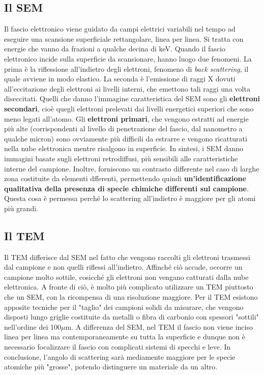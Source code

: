 \documentclass{book}
\begin{document}
                \subsection*{Il SEM}
                        Il fascio elettronico viene guidato da campi elettrici variabili nel tempo 
                        ad eseguire una scansione superficiale rettangolare, linea per linea. Si tratta
                        con energie che vanno da frazioni a qualche decina di keV. Quando il fascio elettronico
                        incide sulla superficie da scansionare, hanno luogo due fenomeni. La prima è la riflessione 
                        all'indietro degli elettroni, fenomeno di \textit{back scattering}, il quale avviene in modo elastico.
                        La seconda è l'emissione di raggi X dovuti all'eccitazione degli elettroni ai livelli interni, che emettono 
                        tali raggi una volta diseccitati. Quelli che danno l'immagine caratteristica del SEM sono gli \textbf{elettroni secondari},
                        cioè quegli elettroni prelevati dai livelli energetici superiori che sono meno legati all'atomo. Gli \textbf{elettroni primari},
                        che vengono estratti ad energie più alte (corrispondenti al livello di penetrazione del fascio, dal nanometro a qualche micron) sono 
                        ovviamente più difficili da estrarre e vengono ricatturati nella nube elettronica mentre risalgono in superficie.
                        In sintesi, i SEM danno immagini basate sugli elettroni retrodiffusi, più sensibili alle caratteristiche interne del campione. Inoltre,
                        forniscono un contrasto differente nel caso di larghe zona costituite da elementi dfferenti, permettendo quindi
                        \textbf{un'identificazione qualitativa della presenza di specie chimiche differenti sul campione}. Questa cosa è permessa perché
                        lo scattering all'indietro è maggiore per gli atomi più grandi.
                \subsection*{Il TEM}
                        Il TEM differisce dal SEM nel fatto che vengono raccolti gli elettroni trasmessi dal campione 
                        e non quelli riflessi all'indietro. Affinché ciò accade, occorre un campione molto sottile, cosicché gli 
                        elettroni non vengano catturati dalla nube elettronica. A fronte di ciò, è molto più complicato utilizzare un TEM
                        piuttosto che un SEM, con la ricompensa di una risoluzione maggiore. Per il TEM esistono apposite tecniche per il "taglio"
                        dei campioni solidi da misurare, che vengono disposti lungo griglie costituite da metalli o fibra di carbonio con 
                        spessori "sottili" nell'ordine dei 100$\mu$m. A differenza del SEM, nel TEM il fascio non viene inciso linea per linea ma
                        contemporaneamente su tutta la superficie e dunque non è necessario focalizzare il fascio con complicati sistemi di specchi e leve.
                        In conclusione, l'angolo di scattering  sarà mediamente maggiore per le specie atomiche più "grosse", potendo distinguere un materiale
                        da un altro.
\end{document}
